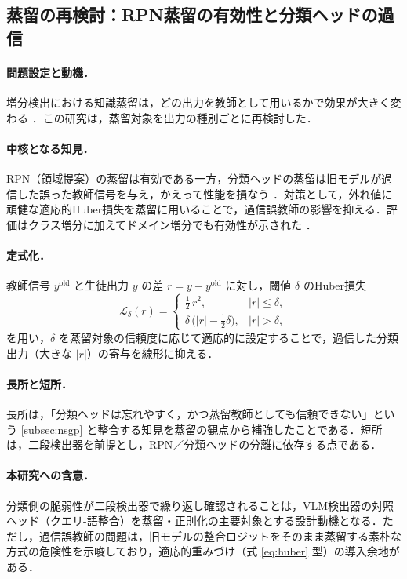 \subsection{蒸留の再検討：RPN蒸留の有効性と分類ヘッドの過信}
\label{subsec:redistill}

\paragraph{問題設定と動機．}
増分検出における知識蒸留は，どの出力を教師として用いるかで効果が大きく変わる \cite{redistill}．この研究は，蒸留対象を出力の種別ごとに再検討した．

\paragraph{中核となる知見．}
RPN（領域提案）の蒸留は有効である一方，分類ヘッドの蒸留は旧モデルが過信した誤った教師信号を与え，かえって性能を損なう \cite{redistill}．対策として，外れ値に頑健な適応的Huber損失を蒸留に用いることで，過信誤教師の影響を抑える．評価はクラス増分に加えてドメイン増分でも有効性が示された \cite{redistill}．

\paragraph{定式化．}
教師信号 $y^{\mathrm{old}}$ と生徒出力 $y$ の差 $r = y - y^{\mathrm{old}}$ に対し，閾値 $\delta$ のHuber損失
\begin{equation}
\mathcal{L}_{\delta}(r) =
\begin{cases}
\tfrac{1}{2}\,r^{2}, & |r| \leq \delta,\\[2pt]
\delta\,\big(|r| - \tfrac{1}{2}\delta\big), & |r| > \delta,
\end{cases}
\label{eq:huber}
\end{equation}
を用い，$\delta$ を蒸留対象の信頼度に応じて適応的に設定することで，過信した分類出力（大きな $|r|$）の寄与を線形に抑える．

\paragraph{長所と短所．}
長所は，「分類ヘッドは忘れやすく，かつ蒸留教師としても信頼できない」という \ref{subsec:nsgp} と整合する知見を蒸留の観点から補強したことである．短所は，二段検出器を前提とし，RPN／分類ヘッドの分離に依存する点である．

\paragraph{本研究への含意．}
分類側の脆弱性が二段検出器で繰り返し確認されることは，VLM検出器の対照ヘッド（クエリ-語整合）を蒸留・正則化の主要対象とする設計動機となる．ただし，過信誤教師の問題は，旧モデルの整合ロジットをそのまま蒸留する素朴な方式の危険性を示唆しており，適応的重みづけ（式 \eqref{eq:huber} 型）の導入余地がある．



